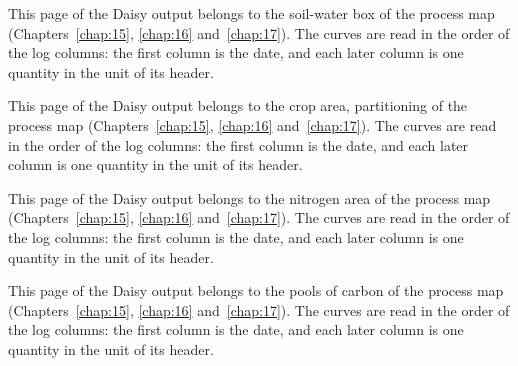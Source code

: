 \par\vspace{6pt}\noindent{}\par\nobreak
{}\label{fig:a21s_5}
\par\noindent This page of the Daisy output belongs to the soil-water box of the process map (Chapters~\ref{chap:15}, \ref{chap:16} and~\ref{chap:17}). The curves are read in the order of the log columns: the first column is the date, and each later column is one quantity in the unit of its header.
\par\vspace{6pt}\noindent{}\par\nobreak
{}\label{fig:a21s_6}
\par\noindent This page of the Daisy output belongs to the crop area, partitioning of the process map (Chapters~\ref{chap:15}, \ref{chap:16} and~\ref{chap:17}). The curves are read in the order of the log columns: the first column is the date, and each later column is one quantity in the unit of its header.
\par\vspace{6pt}\noindent{}\par\nobreak
{}\label{fig:a21s_7}
\par\noindent This page of the Daisy output belongs to the nitrogen area of the process map (Chapters~\ref{chap:15}, \ref{chap:16} and~\ref{chap:17}). The curves are read in the order of the log columns: the first column is the date, and each later column is one quantity in the unit of its header.
\par\vspace{6pt}\noindent{}\par\nobreak
{}\label{fig:a21s_8}
\par\noindent This page of the Daisy output belongs to the pools of carbon of the process map (Chapters~\ref{chap:15}, \ref{chap:16} and~\ref{chap:17}). The curves are read in the order of the log columns: the first column is the date, and each later column is one quantity in the unit of its header.
